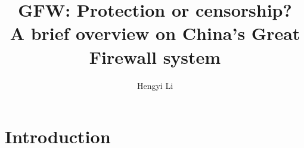 \documentclass[11pt]{article}
\title{GFW: Protection or censorship?\\ \large A brief overview on China's Great Firewall system}
\author{Hengyi Li}
\begin{document}
\maketitle

\section{Introduction}
\end{document}
